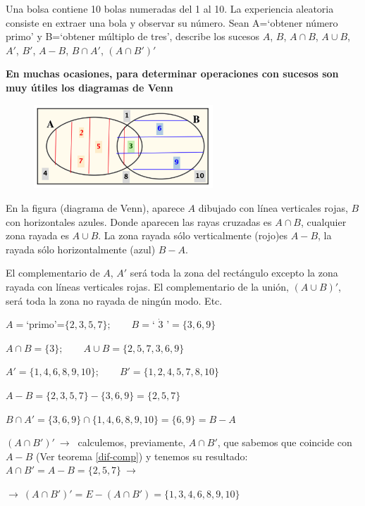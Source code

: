 \begin{ejemplo}
\begin{ejre}
Una bolsa contiene 10 bolas numeradas del 1 al 10. La experiencia aleatoria consiste en extraer una bola y observar su número. Sean A=`obtener número primo' y B=`obtener múltiplo de tres', describe los sucesos $A$, $B$, $A\cap B$, $A\cup B$, $A'$, $B'$, $A-B$, $B\cap A'$, $(A\cap B')'$	

\vspace{4mm} \textbf{En muchas ocasiones, para determinar operaciones con sucesos son muy útiles los diagramas de Venn}


	\begin{figure}[H]
			\centering
			\includegraphics[width=0.6\textwidth]{imagenes/imagenes02/T02IM09.png}
	\end{figure}
	
	
	\begin{scriptsize} En la figura (diagrama de Venn), aparece $A$ dibujado con línea verticales rojas, $B$ con horizontales azules. Donde aparecen las rayas cruzadas es $A\cap B$, cualquier zona rayada es $A\cup B$. La zona rayada sólo verticalmente (rojo)es $A-B$, la rayada sólo horizontalmente (azul) $B-A$.\end{scriptsize}
	\begin{scriptsize} El complementario de $A$, $A'$ será toda la zona del rectángulo excepto la zona rayada con líneas verticales rojas. El complementario de la unión, $(A\cup B)'$, será toda la zona no rayada de ningún modo. Etc.\end{scriptsize}

$A=$`primo'=$\{2,3,5,7\};\qquad B=$` $\dot{3}$ '$=\{3,6,9\}$

$A\cap B=\{3\}; \qquad A\cup B=\{2,5,7,3,6,9\}$

$A'=\{1,4,6,8,9,10\};\qquad B'=\{1,2,4,5,7,8,10\}$

$A-B=\{2,3,5,7\}-\{3,6,9\}=\{2,5,7\}$

$B\cap A'=\{3,6,9\} \cap \{1,4,6,8,9,10\}=\{6,9\}=B-A$

$(A\cap B')' \ \to \ $ calculemos, previamente, $A\cap B'$, que sabemos que coincide con $A-B$ \textcolor{gris}{(Ver teorema \ref{dif-comp})} y tenemos su resultado:
$A \cap B'=A-B=\{2,5,7\} \ \to \ $

$\to \ (A\cap B')'=E-(A\cap B')=\{1,3,4,6,8,9,10\}$

\end{ejre}	
\end{ejemplo}

